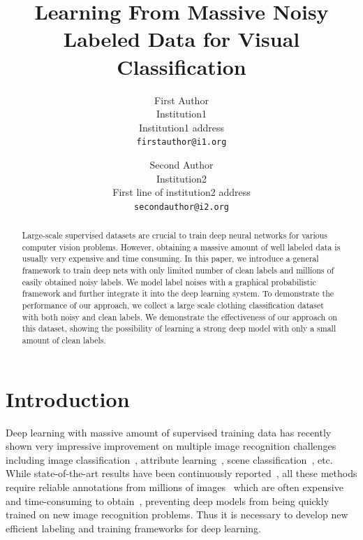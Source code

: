 \documentclass[10pt,twocolumn,letterpaper]{article}
\begin{document}

\title{Learning From Massive Noisy Labeled Data for Visual Classification}

\author{First Author\\
Institution1\\
Institution1 address\\
{\tt\small firstauthor@i1.org}
\and
Second Author\\
Institution2\\
First line of institution2 address\\
{\tt\small secondauthor@i2.org}
}

\maketitle

\begin{abstract}
Large-scale supervised datasets are crucial to train deep neural networks for various computer vision problems. However, obtaining a massive amount of well labeled data is usually very expensive and time consuming. In this paper, we introduce a general framework to train deep nets with only limited number of clean labels and millions of easily obtained noisy labels. We model label noises with a graphical probabilistic framework and further integrate it into the deep learning system. To demonstrate the performance of our approach, we collect a large scale clothing classification dataset with both noisy and clean labels. We demonstrate the effectiveness of our approach on this dataset, showing the possibility of learning a strong deep model with only a small amount of clean labels.
\end{abstract}

\section{Introduction} %
\label{sec:introduction}

Deep learning with massive amount of supervised training data has recently shown very impressive improvement on multiple image recognition challenges including image classification~\cite{krizhevsky2012imagenet}, attribute learning~\cite{zhang2013panda}, scene classification~\cite{farabet2013learning}, etc. While state-of-the-art results have been continuously reported~\cite{zeiler2013visualizing,simonyan2014very,szegedy2014going}, all these methods require reliable annotations from millions of images~\cite{deng2009imagenet} which are often expensive and time-consuming to obtain~\cite{deng2009imagenet}, preventing deep models from being quickly trained on new image recognition problems. Thus it is necessary to develop new efficient labeling and training frameworks for deep learning.
\end{document}
